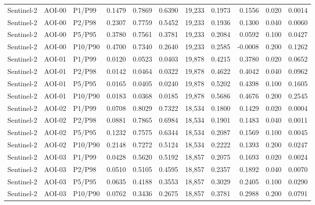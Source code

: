 \begin{landscape}
\begin{longtable}{lllrrrrrrrr}
Sentinel-2 & AOI-00 & P1/P99 & 0.1479 & 0.7869 & 0.6390 & 19,233 & 0.1973 & 0.1556 & 0.020 & 0.0014 \\
Sentinel-2 & AOI-00 & P2/P98 & 0.2307 & 0.7759 & 0.5452 & 19,233 & 0.1936 & 0.1300 & 0.040 & 0.0060 \\
Sentinel-2 & AOI-00 & P5/P95 & 0.3780 & 0.7561 & 0.3781 & 19,233 & 0.2084 & 0.0592 & 0.100 & 0.0427 \\
Sentinel-2 & AOI-00 & P10/P90 & 0.4700 & 0.7340 & 0.2640 & 19,233 & 0.2585 & -0.0008 & 0.200 & 0.1262 \\
Sentinel-2 & AOI-01 & P1/P99 & 0.0120 & 0.0523 & 0.0403 & 19,878 & 0.4215 & 0.3780 & 0.020 & 0.0652 \\
Sentinel-2 & AOI-01 & P2/P98 & 0.0142 & 0.0464 & 0.0322 & 19,878 & 0.4622 & 0.4042 & 0.040 & 0.0962 \\
Sentinel-2 & AOI-01 & P5/P95 & 0.0165 & 0.0405 & 0.0240 & 19,878 & 0.5202 & 0.4398 & 0.100 & 0.1605 \\
Sentinel-2 & AOI-01 & P10/P90 & 0.0183 & 0.0368 & 0.0185 & 19,878 & 0.5686 & 0.4676 & 0.200 & 0.2545 \\
Sentinel-2 & AOI-02 & P1/P99 & 0.0708 & 0.8029 & 0.7322 & 18,534 & 0.1800 & 0.1429 & 0.020 & 0.0004 \\
Sentinel-2 & AOI-02 & P2/P98 & 0.0881 & 0.7865 & 0.6984 & 18,534 & 0.1901 & 0.1483 & 0.040 & 0.0011 \\
Sentinel-2 & AOI-02 & P5/P95 & 0.1232 & 0.7575 & 0.6344 & 18,534 & 0.2087 & 0.1569 & 0.100 & 0.0045 \\
Sentinel-2 & AOI-02 & P10/P90 & 0.2148 & 0.7272 & 0.5124 & 18,534 & 0.2222 & 0.1393 & 0.200 & 0.0247 \\
Sentinel-2 & AOI-03 & P1/P99 & 0.0428 & 0.5620 & 0.5192 & 18,857 & 0.2075 & 0.1693 & 0.020 & 0.0024 \\
Sentinel-2 & AOI-03 & P2/P98 & 0.0510 & 0.5105 & 0.4595 & 18,857 & 0.2357 & 0.1892 & 0.040 & 0.0070 \\
Sentinel-2 & AOI-03 & P5/P95 & 0.0635 & 0.4188 & 0.3553 & 18,857 & 0.3029 & 0.2405 & 0.100 & 0.0290 \\
Sentinel-2 & AOI-03 & P10/P90 & 0.0762 & 0.3436 & 0.2675 & 18,857 & 0.3781 & 0.2988 & 0.200 & 0.0791 \\
\bottomrule\end{longtable}
\end{landscape}
